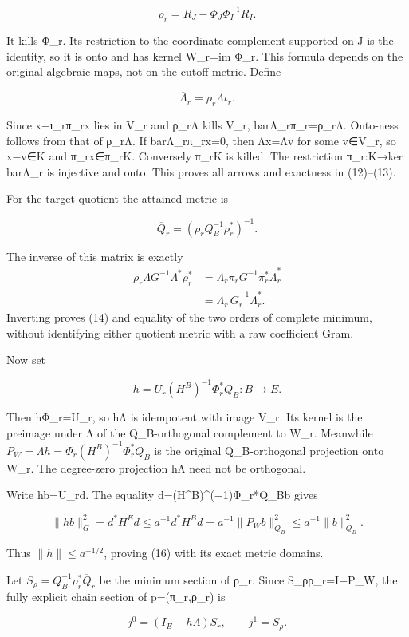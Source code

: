 \documentclass[11pt]{article}
\begin{document}
\[
\rho_r=R_J-\Phi_J\Phi_I^{-1}R_I.
\]

It kills Φ\_r. Its restriction to the coordinate complement supported on J is the identity, so it is onto and has kernel W\_r=im Φ\_r. This formula depends on the original algebraic maps, not on the cutoff metric. Define

\[
\overline\Lambda_r=\rho_r\Lambda\iota_r.
\]

Since x−ι\_rπ\_rx lies in V\_r and ρ\_rΛ kills V\_r, barΛ\_rπ\_r=ρ\_rΛ. Onto-ness follows from that of ρ\_rΛ. If barΛ\_rπ\_rx=0, then Λx=Λv for some v∈V\_r, so x−v∈K and π\_rx∈π\_rK. Conversely π\_rK is killed. The restriction π\_r:K→ker barΛ\_r is injective and onto. This proves all arrows and exactness in (12)--(13).

For the target quotient the attained metric is

\[
\overline Q_r=(\rho_rQ_B^{-1}\rho_r^*)^{-1}.
\]

The inverse of this matrix is exactly \[
\begin{aligned}
\rho_r\Lambda G^{-1}\Lambda^*\rho_r^*
&=\overline\Lambda_r\pi_rG^{-1}\pi_r^*\overline\Lambda_r^*\\
&=\overline\Lambda_r\,\overline G_r^{-1}\overline\Lambda_r^* .
\end{aligned}
\] Inverting proves (14) and equality of the two orders of complete minimum, without identifying either quotient metric with a raw coefficient Gram.

Now set

\[
h=U_r(H^B)^{-1}\Phi_r^*Q_B:B\longrightarrow E. \tag{F15}
\]

Then hΦ\_r=U\_r, so hΛ is idempotent with image V\_r. Its kernel is the preimage under Λ of the Q\_B-orthogonal complement to W\_r. Meanwhile \(P_W=\Lambda h=\Phi_r(H^B)^{-1}\Phi_r^*Q_B\) is the original Q\_B-orthogonal projection onto W\_r. The degree-zero projection hΛ need not be orthogonal.

Write hb=U\_rd. The equality d=(H\^{}B)\^{}(−1)Φ\_r*Q\_Bb gives

\[
\|hb\|_G^2=d^*H^Ed\le a^{-1}d^*H^Bd
=a^{-1}\|P_Wb\|_{Q_B}^2\le a^{-1}\|b\|_{Q_B}^2.
\]

Thus \(\|h\|\le a^{-1/2}\), proving (16) with its exact metric domains.

Let \(S_\rho=Q_B^{-1}\rho_r^*\overline Q_r\) be the minimum section of ρ\_r. Since S\_ρρ\_r=I−P\_W, the fully explicit chain section of p=(π\_r,ρ\_r) is

\[
j^0=(I_E-h\Lambda)S_r,
\qquad j^1=S_\rho. \tag{F17a}
\]
\end{document}
